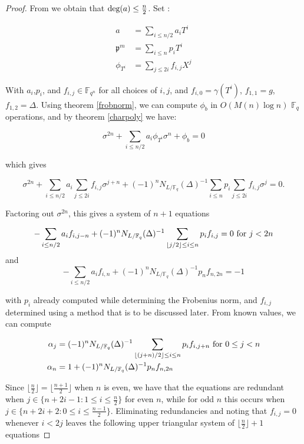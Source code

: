 \documentclass{jams-l}
\theoremstyle{remark}
\numberwithin{equation}{section}
\begin{document}
\begin{proof}

From \cite{frobdist} we obtain that $\textnormal{deg}(a) \leq \frac{n}{2}$. Set :

\begin{align*}
a & = \sum_{i \leq n/2} a_i T^i \\
\mathfrak{p}^m & = \sum_{i \leq n} p_iT^i \\
\phi_{T^i} & = \sum_{j \leq 2i} f_{i,j} X^{j}
\end{align*}


\noindent With $a_i$,$p_i$, and $f_{i,j} \in \mathbb{F}_{q^n}$ for all choices of $i,j$, and $f_{i,0} = \gamma(T^i)$, $f_{1,1} = g$, $f_{1,2} = \Delta$. Using theorem \ref{frobnorm}, we can compute $\phi_b$ in $O(M(n)\log n)$ $\mathbb{F}_q$ operations, and by theorem \ref{charpoly} we have:

\[ \sigma^{2n} + \sum_{i \leq n/2} a_i \phi_{T^i}\sigma^n + \phi_b = 0  \]

\noindent which gives

\[ \sigma^{2n} + \sum_{i \leq n/2} a_i \sum_{j \leq 2i} f_{i,j}\sigma^{j+n} + (-1)^nN_{L/\mathbb{F}_q}(\Delta)^{-1}\sum_{i \leq n} p_i\sum_{j \leq 2i} f_{i,j} \sigma^{j} = 0.  \]

\noindent Factoring out $\sigma^{2n}$, this gives a system of $n+1$ equations

\[ - \sum_{i \leq n/2} a_i f_{i,j-n} + (-1)^n N_{L/\mathbb{F}_q}(\Delta)^{-1} \sum_{\lfloor j/2 \rfloor \leq i \leq n} p_i f_{i,j} = 0 \textnormal{ for } j < 2n \]
\noindent and
\[ - \sum_{i \leq n/2} a_i f_{i,n} + (-1)^n N_{L/\mathbb{F}_q}(\Delta)^{-1}  p_n f_{n,2n} = -1 \]

\noindent with $p_i$ already computed while determining the Frobenius norm, and $f_{i,j}$ determined using a method that is to be discussed later. From known values, we can compute

\begin{align*}
\alpha_j & = (-1)^nN_{L/\mathbb{F}_q}(\Delta)^{-1} \sum_{\lfloor (j+n)/2 \rfloor \leq i \leq n} p_i f_{i,j + n}\textnormal{ for } 0 \leq j < n \\
\alpha_{n} & = 1 + (-1)^nN_{L/\mathbb{F}_q}(\Delta)^{-1}  p_n f_{n,2n}
\end{align*}

Since $\lfloor \frac{n}{2} \rfloor = \lfloor \frac{n + 1}{2} \rfloor$ when $n$ is even, we have that the equations are redundant when $j \in \{n + 2i - 1 : 1 \leq i \leq \frac{n}{2} \}$ for even $n$, while for odd $n$ this occurs when $j \in \{n + 2i + 2 : 0 \leq i \leq \frac{n-1}{2}\}$. Eliminating redundancies and noting that $f_{i,j} = 0$ whenever $i < 2j$ leaves the following upper triangular system of $\lfloor\frac{n}{2}\rfloor + 1$ equations



\end{proof}
\end{document}
